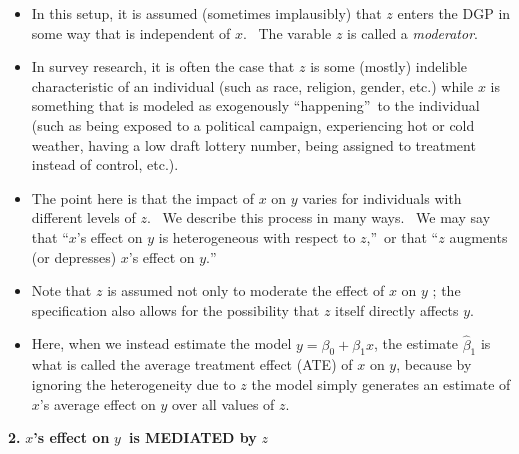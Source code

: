 \documentclass[11pt]{article}
\begin{document}
\begin{itemize}
\item In this setup, it is assumed (sometimes implausibly) that $z$ enters
the DGP in some way that is independent of $x$. \ The varable $z$ is called
a \textit{moderator}. \ 

\item In survey research, it is often the case that $z$ is some (mostly)
indelible characteristic of an individual (such as race, religion, gender,
etc.) while $x$ is something that is modeled as exogenously
\textquotedblleft happening\textquotedblright\ to the individual (such as
being exposed to a political campaign, experiencing hot or cold weather,
having a low draft lottery number, being assigned to treatment instead of
control, etc.). \ 

\item The point here is that the impact of $x$ on $y$ varies for individuals
with different levels of $z$. \ We describe this process in many ways. \ We
may say that \textquotedblleft $x$'s effect on $y$ is heterogeneous with
respect to $z$,\textquotedblright\ or that \textquotedblleft $z$ augments
(or depresses) $x$'s effect on $y.$\textquotedblright\ \ 

\item Note that $z$ is assumed not only to moderate the effect of $x$ on $y$%
; the specification also allows for the possibility that $z$ itself directly
affects $y$.

\item Here, when we instead estimate the model $y=\beta _{0}+\beta _{1}x$,
the estimate $\widehat{\beta }_{1}$ is what is called the average treatment
effect (ATE) of $x$ on $y$, because by ignoring the heterogeneity due to $z$
the model simply generates an estimate of $x$'s average effect on $y$ over
all values of $z$. \ \bigskip
\end{itemize}

\pagebreak \textbf{2. }$x$\textbf{'s effect on }$y$\textbf{\ is MEDIATED by }%
$z$ \ 
\end{document}
